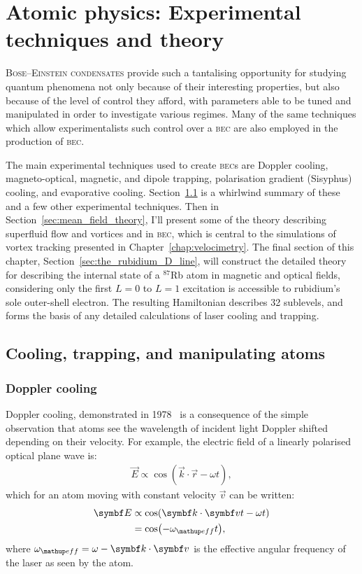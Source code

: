 \chapter{Atomic physics: Experimental techniques and theory}\label{chap:atomic_physics}

\lettrine[lines=3]{B}{ose--Einstein condensates} provide such a tantalising opportunity for studying quantum phenomena not only because of their interesting properties, but also because of the level of control they afford, with parameters able to be tuned and manipulated in order to investigate various regimes. Many of the same techniques which allow experimentalists such control over a \textsc{bec} are also employed in the production of \textsc{bec}.

The main experimental techniques used to create \textsc{bec}s are Doppler cooling, magneto-optical, magnetic, and dipole trapping, polarisation gradient (Sisyphus) cooling, and evaporative cooling. Section~\ref{sec:cooling_and_trapping} is a whirlwind summary of these and a few other experimental techniques. Then in Section~\ref{sec:mean_field_theory}, I'll present some of the theory describing superfluid flow and vortices and in \textsc{bec}, which is central to the simulations of vortex tracking presented in Chapter~\ref{chap:velocimetry}. The final section of this chapter, Section~\ref{sec:the_rubidium_D_line}, will construct the detailed theory for describing the internal state of a $^{87}$Rb atom in magnetic and optical fields, considering only the first $L=0$ to $L=1$ excitation is accessible to rubidium's  sole outer-shell electron. The resulting Hamiltonian describes 32 sublevels, and forms the basis of any detailed calculations of laser cooling and trapping.

\section{Cooling, trapping, and manipulating atoms}\label{sec:cooling_and_trapping}

\subsection{Doppler cooling}\label{sec:doppler_cooling}

Doppler cooling, demonstrated in 1978~\cite{wineland_radiation-pressure_1978} is a consequence of the simple observation that atoms see the wavelength of incident light Doppler shifted depending on their velocity. For example, the electric field of a linearly polarised optical plane wave is:
\begin{align}
\vec E \propto \cos(\vec k \cdot \vec r - \omega t),
\end{align}
which for an atom moving with constant velocity $\vec v$ can be written:
\begin{align}
\vec E &\propto \cos(\vec k \cdot \vec v t - \omega t)\\
&= \cos(- \omega_\up{eff} t),
\end{align}
where $\omega_\up{eff} = \omega - \vec k \cdot \vec v$ is the effective angular frequency of the laser as seen by the atom.


